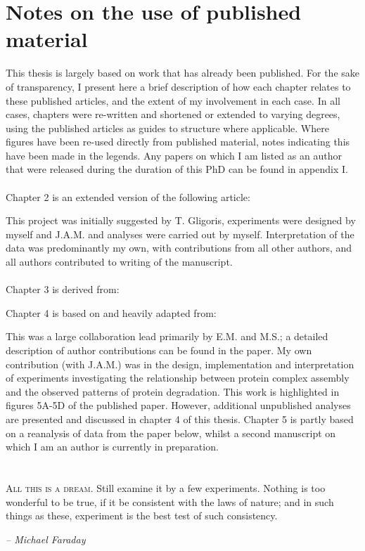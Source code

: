 \documentclass[a4paper,11pt,twoside,openright]{scrbook}
\begin{document}
\chapter*{Notes on the use of published material}
This thesis is largely based on work that has already been published. For the sake of transparency, I present here a brief description of how each chapter relates to these published articles, and the extent of my involvement in each case. In all cases, chapters were re-written and shortened or extended to varying degrees, using the published articles as guides to structure where applicable. Where figures have been re-used directly from published material, notes indicating this have been made in the legends. Any papers on which I am listed as an author that were released during the duration of this PhD can be found in appendix I.
\\~\\
Chapter 2 is an extended version of the following article:
\begin{quote}
\end{quote}
This project was initially suggested by T. Gligoris, experiments were designed by myself and J.A.M. and analyses were carried out by myself. Interpretation of the data was predominantly my own, with contributions from all other authors, and all authors contributed to writing of the manuscript.
\\~\\
Chapter 3 is derived from:
\begin{quote}
\end{quote}
Chapter 4 is based on and heavily adapted from:
\begin{quote}
\end{quote}
This was a large collaboration lead primarily by E.M. and M.S.; a detailed description of author contributions can be found in the paper. My own contribution (with J.A.M.) was in the design, implementation and interpretation of experiments investigating the relationship between protein complex assembly and the observed patterns of protein degradation. This work is highlighted in figures 5A-5D of the published paper. However, additional unpublished analyses are presented and discussed in chapter 4 of this thesis.
Chapter 5 is partly based on a reanalysis of data from the paper below, whilst a second manuscript on which I am an author is currently in preparation.

\chapter*{}
\setlength{\epigraphwidth}{.45\textwidth}
\setlength{\epigraphrule}{0pt}
\epigraph{\textsc{All this is a dream}. Still examine it by a few experiments. Nothing is too wonderful to be true, if it be consistent with the laws of nature; and in such things as these, experiment is the best test of such consistency.}{\textit{-- Michael Faraday}}
\end{document}
